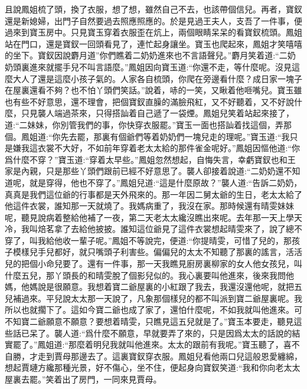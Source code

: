 \begin{parag}
    且說鳳姐梳了頭，換了衣服，想了想，雖然自己不去，也該帶個信兒。再者，寶釵還是新媳婦，出門子自然要過去照應照應的。於是見過王夫人，支吾了一件事，便過來到寶玉房中。只見寶玉穿着衣服歪在炕上，兩個眼睛呆呆的看寶釵梳頭。鳳姐站在門口，還是寶釵一回頭看見了，連忙起身讓坐。寶玉也爬起來，鳳姐才笑嘻嘻的坐下。寶釵因說麝月道”你們瞧着二奶奶進來也不言語聲兒。”麝月笑着道:“二奶奶頭裏進來就擺手兒不叫言語麼。”鳳姐因向寶玉道:“你還不走，等什麼呢。沒見這麼大人了還是這麼小孩子氣的。人家各自梳頭，你爬在旁邊看什麼？成日家一塊子在屋裏還看不夠？也不怕丫頭們笑話。”說着，哧的一笑，又瞅着他咂嘴兒。寶玉雖也有些不好意思，還不理會，把個寶釵直臊的滿臉飛紅，又不好聽着，又不好說什麼，只見襲人端過茶來，只得搭訕着自己遞了一袋煙。鳳姐兒笑着站起來接了，道:“二妹妹，你別管我們的事，你快穿衣服罷。”寶玉一面也搭訕着找這個，弄那個。鳳姐道:“你先去罷，那裏有個爺們等着奶奶們一塊兒走的理呢。”寶玉道:“我只是嫌我這衣裳不大好，不如前年穿着老太太給的那件雀金呢好。”鳳姐因慪他道:“你爲什麼不穿？”寶玉道:“穿着太早些。”鳳姐忽然想起，自悔失言，幸虧寶釵也和王家是內親，只是那些丫頭們跟前已經不好意思了。襲人卻接着說道:“二奶奶還不知道呢，就是穿得，他也不穿了。”鳳姐兒道:“這是什麼原故？”襲人道:“告訴二奶奶，真真是我們這位爺的行事都是天外飛來的。那一年因二舅太爺的生日，老太太給了他這件衣裳，誰知那一天就燒了。我媽病重了，我沒在家。那時候還有晴雯妹妹呢，聽見說病着整給他補了一夜，第二天老太太纔沒瞧出來呢。去年那一天上學天冷，我叫焙茗拿了去給他披披。誰知這位爺見了這件衣裳想起晴雯來了，說了總不穿了，叫我給他收一輩子呢。”鳳姐不等說完，便道:“你提晴雯，可惜了兒的，那孩子模樣兒手兒都好，就只嘴頭子利害些。偏偏兒的太太不知聽了那裏的謠言，活活兒的把個小命兒要了。還有一件事，那一天我瞧見廚房裏柳家的女人他女孩兒，叫什麼五兒，那丫頭長的和晴雯脫了個影兒似的。我心裏要叫他進來，後來我問他媽，他媽說是很願意。我想着寶二爺屋裏的小紅跟了我去，我還沒還他呢，就把五兒補過來。平兒說太太那一天說了，凡象那個樣兒的都不叫派到寶二爺屋裏呢。我所以也就擱下了。這如今寶二爺也成了家了，還怕什麼呢，不如我就叫他進來。可不知寶二爺願意不願意？要想着晴雯，只瞧見這五兒就是了。”寶玉本要走，聽見這些話已呆了。襲人道:“爲什麼不願意，早就要弄了來的，只是因爲太太的話說的結實罷了。”鳳姐道:“那麼着明兒我就叫他進來。太太的跟前有我呢。”寶玉聽了，喜不自勝，才走到賈母那邊去了。這裏寶釵穿衣服。鳳姐兒看他兩口兒這般恩愛纏綿，想起賈璉方纔那種光景，好不傷心，坐不住，便起身向寶釵笑道:“我和你向老太太屋裏去罷。”笑着出了房門，一同來見賈母。
\end{parag}


